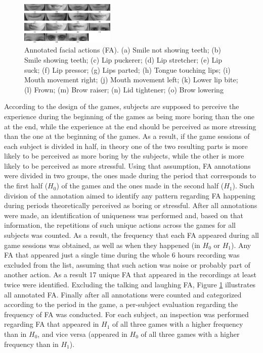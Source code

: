 \begin{figure}[!h]
\centering
\includegraphics[width=0.4\textwidth]{Content/figures/facial-actions}
\caption{Annotated facial actions (FA). (a) Smile not showing teeth; (b) Smile showing teeth; (c) Lip puckerer; (d) Lip stretcher; (e) Lip suck; (f) Lip pressor; (g) Lips parted; (h) Tongue touching lips; (i) Mouth movement right; (j) Mouth movement left; (k) Lower lip bite; (l) Frown; (m) Brow raiser; (n) Lid tightener; (o) Brow lowering}
\label{fig:fa}
\end{figure}

According to the design of the games, subjects are supposed to perceive the experience during the beginning of the games as being more boring than the one at the end, while the experience at the end should be perceived as more stressing than the one at the beginning of the games. As a result, if the game sessions of each subject is divided in half, in theory one of the two resulting parts is more likely to be perceived as more boring by the subjects, while the other is more likely to be perceived as more stressful. Using that assumption, FA annotations were divided in two groups, the ones made during the period that corresponds to the first half ($H_0$) of the games and the ones made in the second half ($H_1$). Such division of the annotation aimed to identify any pattern regarding FA happening during periods theoretically perceived as boring or stressful. After all annotations were made, an identification of uniqueness was performed and, based on that information, the repetitions of such unique actions across the games for all subjects was counted. As a result, the frequency that each FA appeared during all game sessions was obtained, as well as when they happened (in $H_0$ or $H_1$). Any FA that appeared just a single time during the whole 6 hours recording was excluded from the list, assuming that such action was noise or probably part of another action. As a result 17 unique FA that appeared in the recordings at least twice were identified. Excluding the talking and laughing FA, Figure \ref{fig:fa} illustrates all annotated FA. Finally after all annotations were counted and categorized according to the period in the game, a per-subject evaluation regarding the frequency of FA was conducted. For each subject, an inspection was performed regarding FA that appeared in $H_1$ of all three games with a higher frequency than in $H_0$, and vice versa (appeared in $H_0$ of all three games with a higher frequency than in $H_1$).


